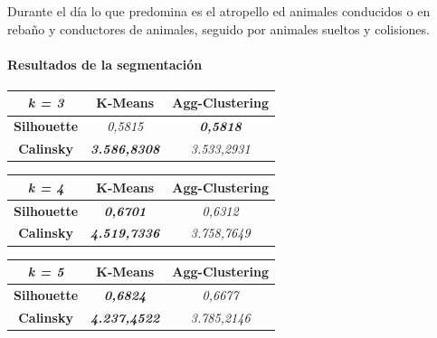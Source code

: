 Durante el día lo que predomina es el atropello ed animales conducidos o en rebaño y conductores de animales, seguido por animales sueltos y colisiones.

\paragraph{Resultados de la segmentación}

\begin{table}[H]
\begin{subtable}[H]{0.45\textwidth}
        \centering
\begin{tabular}{|c|c|c|}
\hline
\textit{k = 3}      & \textbf{K-Means}             & \textbf{Agg-Clustering}  \\ \hline
\textbf{Silhouette} & \textit{0,5815}              & \textit{\textbf{0,5818}} \\ \hline
\textbf{Calinsky}   & \textit{\textbf{3.586,8308}} & \textit{3.533,2931}      \\ \hline
\end{tabular}
\end{subtable}
\hfill
\begin{subtable}[H]{0.45\textwidth}
        \centering
\begin{tabular}{|c|c|c|}
\hline
\textit{k = 4}      & \textbf{K-Means}             & \textbf{Agg-Clustering} \\ \hline
\textbf{Silhouette} & \textit{\textbf{0,6701}}     & \textit{0,6312}         \\ \hline
\textbf{Calinsky}   & \textit{\textbf{4.519,7336}} & \textit{3.758,7649}     \\ \hline
\end{tabular}
\end{subtable}
\begin{subtable}[H]{0.45\textwidth}
        \centering
\begin{tabular}{|c|c|c|}
\hline
\textit{k = 5}      & \textbf{K-Means}             & \textbf{Agg-Clustering} \\ \hline
\textbf{Silhouette} & \textit{\textbf{0,6824}}     & \textit{0,6677}         \\ \hline
\textbf{Calinsky}   & \textit{\textbf{4.237,4522}} & \textit{3.785,2146}     \\ \hline
\end{tabular}
\end{subtable}
\hfill
\begin{subtable}[H]{0.45\textwidth}
        \centering
\begin{tabular}{|c|c|c|}

\end{tabular}
\end{subtable}
\end{table}
